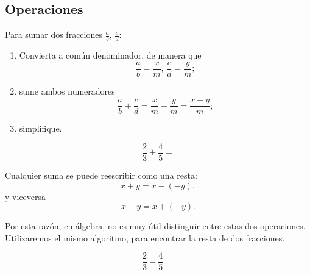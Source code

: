 \subsection{Operaciones}


	\begin{alg}
		Para sumar dos fracciones $\frac{a}{b}, \, \frac{c}{d}:$
		\begin{enumerate}
			\item Convierta a común denominador, de manera que
			$$\dfrac{a}{b}=\dfrac{x}{m}, \, \dfrac{c}{d}=\dfrac{y}{m};$$ 
			\item sume ambos numeradores
			$$
			\dfrac{a}{b}+\dfrac{c}{d}=\dfrac{x}{m}+\frac{y}{m}=\dfrac{x+y}{m};
			$$
			\item simplifique.
		\end{enumerate}
		
	\end{alg}
	




	\begin{problema}
		$$
		\dfrac{2}{3}+\dfrac{4}{5}=%
		$$
	\end{problema}
	



	\begin{rem}
		Cualquier suma se puede reescribir como una resta:
		$$x+y=x-\left( -y \right),$$ 
		y viceversa
		$$x-y=x+\left( -y \right).$$ 
		
		Por esta raz\'on, en álgebra, no es muy útil distinguir entre estas dos operaciones. Utilizaremos el mismo algoritmo, para encontrar la resta de dos fracciones. 
	\end{rem}
	




	\begin{problema}
		$$
		\dfrac{2}{3}-\dfrac{4}{5}=%
		$$
	\end{problema}
	



